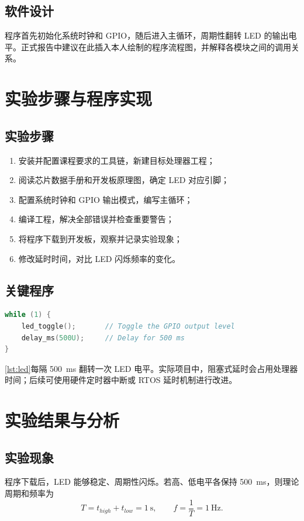 \documentclass[UTF8,zihao=-4,a4paper,oneside,fontset=fandol]{ctexart}
\begin{document}
\subsection{软件设计}
程序首先初始化系统时钟和 GPIO，随后进入主循环，周期性翻转 LED 的输出电平。正式报告中建议在此插入本人绘制的程序流程图，并解释各模块之间的调用关系。

\section{实验步骤与程序实现}
\subsection{实验步骤}
\begin{enumerate}
  \item 安装并配置课程要求的工具链，新建目标处理器工程；
  \item 阅读芯片数据手册和开发板原理图，确定 LED 对应引脚；
  \item 配置系统时钟和 GPIO 输出模式，编写主循环；
  \item 编译工程，解决全部错误并检查重要警告；
  \item 将程序下载到开发板，观察并记录实验现象；
  \item 修改延时时间，对比 LED 闪烁频率的变化。
\end{enumerate}

\subsection{关键程序}
\begin{lstlisting}[language=C,caption={LED 控制核心逻辑},label={lst:led}]
while (1) {
    led_toggle();       // Toggle the GPIO output level
    delay_ms(500U);     // Delay for 500 ms
}
\end{lstlisting}

\cref{lst:led}每隔 \SI{500}{\milli\second} 翻转一次 LED 电平。实际项目中，阻塞式延时会占用处理器时间；后续可使用硬件定时器中断或 RTOS 延时机制进行改进。

\section{实验结果与分析}
\subsection{实验现象}
程序下载后，LED 能够稳定、周期性闪烁。若高、低电平各保持 \SI{500}{\milli\second}，则理论周期和频率为
\begin{equation}
  T=t_{high}+t_{low}=\SI{1}{\second},\qquad
  f=\frac{1}{T}=\SI{1}{\hertz}.
\end{equation}
\end{document}
